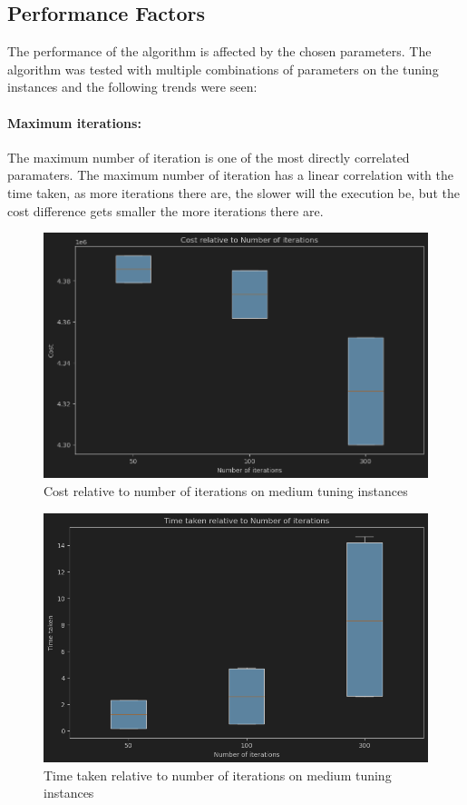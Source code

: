 \documentclass{article}
\begin{document}
\subsection*{Performance Factors}
The performance of the algorithm is affected by the chosen parameters. The algorithm was tested with multiple combinations of parameters on the tuning instances and the following trends were seen:

\paragraph{Maximum iterations:} 
The maximum number of iteration is one of the most directly correlated paramaters. The maximum number of iteration has a linear correlation with the time taken, as more iterations there are, the slower will the execution be, but the cost difference gets smaller the more iterations there are.

\begin{figure}[H]
	\includegraphics[width=\linewidth]{cost_numit_vnd_med.png}
	\caption{Cost relative to number of iterations on medium tuning instances}
\end{figure}

\begin{figure}[H]
	\includegraphics[width=\linewidth]{time_numit_vnd_med.png}
	\caption{Time taken relative to number of iterations on medium tuning instances}
\end{figure}
\end{document}
